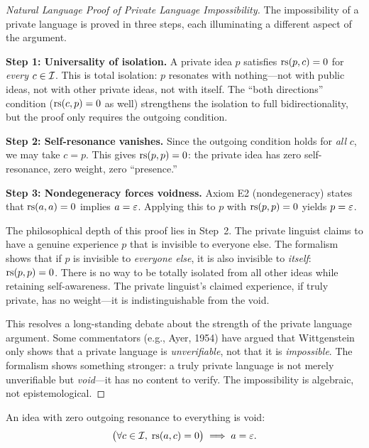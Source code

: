 \begin{proof}[Natural Language Proof of Private Language Impossibility]
The impossibility of a private language is proved in three steps, each
illuminating a different aspect of the argument.

\textbf{Step 1: Universality of isolation.} A private idea $p$ satisfies
$\mathrm{rs}(p, c) = 0$ for \emph{every} $c \in \mathcal{I}$. This is total isolation:
$p$ resonates with nothing---not with public ideas, not with other private
ideas, not with itself. The ``both directions'' condition ($\mathrm{rs}(c, p) = 0$
as well) strengthens the isolation to full bidirectionality, but the proof
only requires the outgoing condition.

\textbf{Step 2: Self-resonance vanishes.} Since the outgoing condition holds
for \emph{all} $c$, we may take $c = p$. This gives $\mathrm{rs}(p, p) = 0$: the
private idea has zero self-resonance, zero weight, zero ``presence.''

\textbf{Step 3: Nondegeneracy forces voidness.} Axiom E2 (nondegeneracy)
states that $\mathrm{rs}(a, a) = 0$ implies $a = \varepsilon$. Applying this to $p$ with
$\mathrm{rs}(p, p) = 0$ yields $p = \varepsilon$.

The philosophical depth of this proof lies in Step~2. The private linguist
claims to have a genuine experience $p$ that is invisible to everyone else.
The formalism shows that if $p$ is invisible to \emph{everyone else}, it is
also invisible to \emph{itself}: $\mathrm{rs}(p, p) = 0$. There is no way to be
totally isolated from all other ideas while retaining self-awareness. The
private linguist's claimed experience, if truly private, has no weight---it
is indistinguishable from the void.

This resolves a long-standing debate about the strength of the private
language argument. Some commentators (e.g., Ayer, 1954) have argued that
Wittgenstein only shows that a private language is \emph{unverifiable}, not
that it is \emph{impossible}. The formalism shows something stronger: a
truly private language is not merely unverifiable but \emph{void}---it has
no content to verify. The impossibility is algebraic, not epistemological.
\end{proof}

\begin{theorem}
\label{thm:private-language-outgoing}
An idea with zero outgoing resonance to everything is void:
\[
\bigl(\forall c \in \mathcal{I},\; \mathrm{rs}(a, c) = 0\bigr) \implies a = \varepsilon.
\]
\end{theorem}

